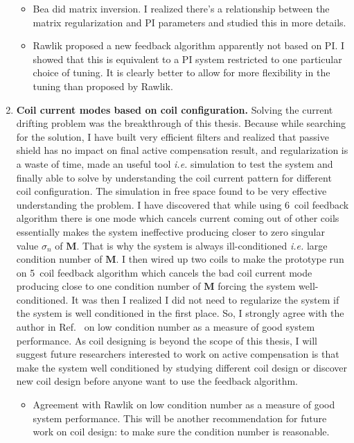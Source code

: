 \begin{enumerate}
\begin{itemize}
\item Bea did matrix inversion.  I realized there's a relationship between the matrix regularization and PI parameters and studied this in more details.
\item Rawlik proposed a new feedback algorithm apparently not based on PI.  I showed that this is equivalent to a PI system restricted to one particular choice of tuning.  It is clearly better to allow for more flexibility in the tuning than proposed by Rawlik.
\end{itemize}

\item {\bf Coil current modes based on coil configuration.}  Solving the current drifting problem was the breakthrough of this thesis. Because while searching for the solution, I have built very efficient filters and realized that passive shield has no impact on final active compensation result, and regularization is a waste of time, made an useful tool {\it i.e.} simulation to test the system and finally able to solve by understanding the coil current pattern for different coil configuration. The simulation in free space found to be very effective understanding the problem. I have discovered that while using 6~coil feedback algorithm there is one mode which cancels current coming out of other coils essentially makes the system ineffective producing closer to zero singular value $\sigma_n$ of $\bm{M}$. That is why the system is always ill-conditioned {\it i.e.} large condition number of $\bm{M}$. I then  wired up two coils to make the prototype run on 5~coil feedback algorithm which cancels the bad coil current mode producing close to one condition number of $\bm{M}$ forcing the system well-conditioned. It was then I realized I did not need to regularize the system if the system is well conditioned in the first place. So, I strongly agree with the author in Ref.~\cite{rawlik} on low condition number as a measure of good system performance. As coil designing is beyond the scope of this thesis, I will suggest future researchers interested to work on active compensation is that make the system well conditioned by studying different coil design or discover new coil design before anyone want to use the feedback algorithm.
\begin{itemize}
\item Agreement with Rawlik on low condition number as a measure of good system performance.  This will be another recommendation for future work on coil design:  to make sure the condition number is reasonable.
\end{itemize}
\end{enumerate}

